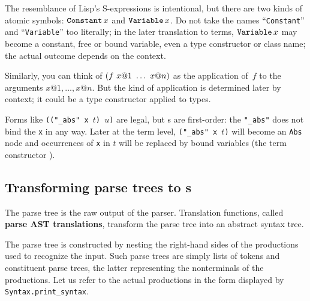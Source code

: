 The resemblance of Lisp's S-expressions is intentional, but there are two
kinds of atomic symbols: $\mathop{\mbox{\tt Constant}}\nolimits x$ and $\mathop{\mbox{\tt Variable}}\nolimits x$.  Do not take the
names ``{\tt Constant}'' and ``{\tt Variable}'' too literally; in the later
translation to terms, $\mathop{\mbox{\tt Variable}}\nolimits x$ may become a constant, free or bound
variable, even a type constructor or class name; the actual outcome depends
on the context.

Similarly, you can think of ${\tt (} f~x@1~\ldots~x@n{\tt )}$ as the
application of~$f$ to the arguments $x@1, \ldots, x@n$.  But the kind of
application is determined later by context; it could be a type constructor
applied to types.

Forms like {\tt (("_abs" x $t$) $u$)} are legal, but \AST{}s are
first-order: the {\tt "_abs"} does not bind the {\tt x} in any way.  Later
at the term level, {\tt ("_abs" x $t$)} will become an {\tt Abs} node and
occurrences of {\tt x} in $t$ will be replaced by bound variables (the term
constructor ).


\subsection{Transforming parse trees to \AST{}s}
The parse tree is the raw output of the parser.  Translation functions,
called {\bf parse AST translations},
transform the parse tree into an abstract syntax tree.

The parse tree is constructed by nesting the right-hand sides of the
productions used to recognize the input.  Such parse trees are simply lists
of tokens and constituent parse trees, the latter representing the
nonterminals of the productions.  Let us refer to the actual productions in
the form displayed by {\tt Syntax.print_syntax}.

